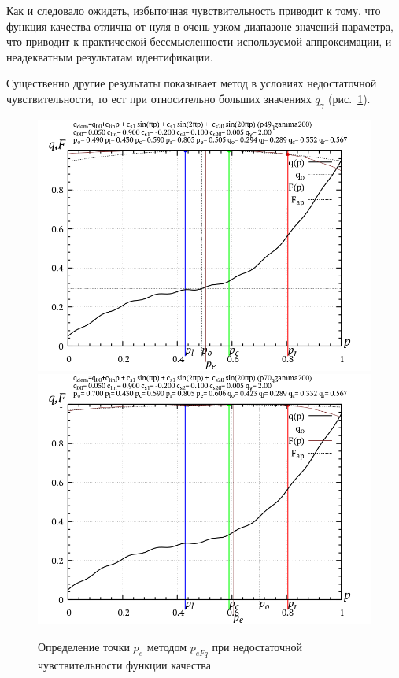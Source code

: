 Как и следовало ожидать, избыточная чувствительность приводит к тому,
что функция качества отлична от нуля в очень узком диапазоне значений параметра,
что приводит к  практической бессмысленности используемой аппроксимации,
и неадекватным результатам идентификации.

Существенно другие результаты показывает метод в условиях
недостаточной чувствительности, то ест при
относительно больших значениях $q_\gamma$ (рис.~\ref{atu:f:p_eFq_intra_200}).

\begin{figure}[htb!]
  \centerline{
    \includegraphics[width=49\TW]{p/p_eFq/q_p_eFq_p49_qgamma200.png}
    \hfill
    \includegraphics[width=49\TW]{p/p_eFq/q_p_eFq_p70_qgamma200.png}
  }
  \caption{Определение точки $p_e$ методом $p_{eFq}$ при недостаточной чувствительности функции качества}
  \label{atu:f:p_eFq_intra_200}
\end{figure}

